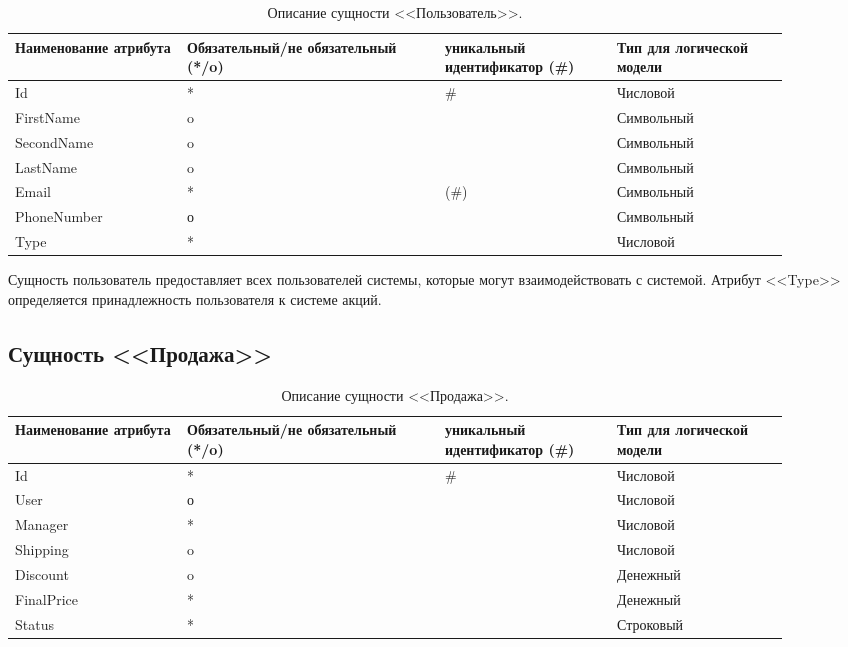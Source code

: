 \documentclass[14pt]{extreport}
\begin{document}
            \begin{table}[H]
                \begin{tabular}{|p{0.2\linewidth}|p{0.3\linewidth}|p{0.2\linewidth}|p{0.2\linewidth}|}
                    \hline
                    Наименование атрибута & Обязательный/не обязательный (*/o) & уникальный идентификатор (\#) & Тип для логической модели
                    \\ \hline
                    Id & * & \# & Числовой \\ \hline
                    FirstName & o & & Символьный\\ \hline
                    SecondName & o & & Символьный\\ \hline
                    LastName & o & & Символьный \\ \hline
                    Email & * & (\#) & Символьный  \\ \hline
                    PhoneNumber & о & & Символьный\\ \hline
                    Type & * & & Числовой \\ \hline
                \end{tabular}

                \caption{Описание сущности <<Пользователь>>.}
            \end{table}
        
        Сущность пользователь предоставляет всех пользователей системы,%
         которые могут взаимодействовать с системой. Атрибут <<Type>> %
          определяется принадлежность пользователя к системе акций.

    \subsection*{Сущность <<Продажа>>}

        \begin{table}[H]
            \begin{tabular}{|p{0.2\linewidth}|p{0.3\linewidth}|p{0.2\linewidth}|p{0.2\linewidth}|}
                \hline
                Наименование атрибута & Обязательный/не обязательный (*/o) & уникальный идентификатор (\#) & Тип для логической модели
                \\ \hline
                Id & * & \# & Числовой \\ \hline
                User & о & & Числовой\\ \hline
                Manager & * & & Числовой\\ \hline
                Shipping & o & & Числовой \\ \hline
                Discount & o & & Денежный \\ \hline  
                FinalPrice & * & & Денежный \\ \hline
                Status & * & & Строковый \\ \hline
            \end{tabular}
            \caption{Описание сущности <<Продажа>>.}
        \end{table}
\end{document}

